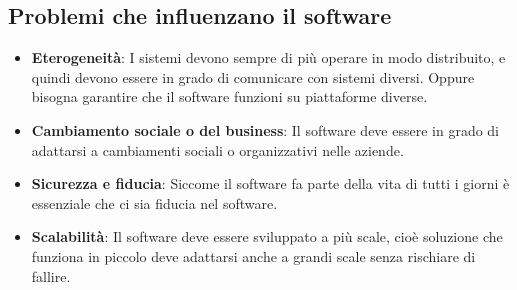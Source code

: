 \documentclass[a4paper]{article}
\begin{document}
\subsection{Problemi che influenzano il software}
\begin{itemize}
  \item \textbf{Eterogeneità}:
    I sistemi devono sempre di più operare in modo distribuito, e quindi devono essere in grado
    di comunicare con sistemi diversi. Oppure bisogna garantire che il software funzioni su
    piattaforme diverse.

  \item 
    \textbf{Cambiamento sociale o del business}:
    Il software deve essere in grado di adattarsi a cambiamenti sociali o organizzativi
    nelle aziende.

  \item 
    \textbf{Sicurezza e fiducia}:
    Siccome il software fa parte della vita di tutti i giorni è essenziale che ci sia
    fiducia nel software.

  \item 
    \textbf{Scalabilità}:
    Il software deve essere sviluppato a più scale, cioè soluzione che funziona in piccolo
    deve adattarsi anche a grandi scale senza rischiare di fallire.
\end{itemize}
\end{document}
